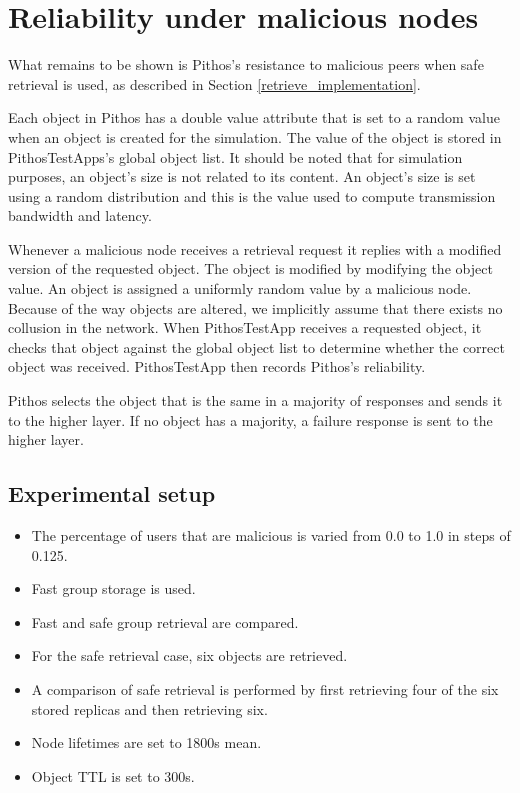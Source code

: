 \section{Reliability under malicious nodes}
\label{malicious_results}

What remains to be shown is Pithos's resistance to malicious peers when safe retrieval is used, as described in Section \ref{retrieve_implementation}.

Each object in Pithos has a double value attribute that is set to a random value when an object is created for the simulation. The value of the object is stored in PithosTestApps's global object list. It should be noted that for simulation purposes, an object's size is not related to its content. An object's size is set using a random distribution and this is the value used to compute transmission bandwidth and latency.

Whenever a malicious node receives a retrieval request it replies with a modified version of the requested object. The object is modified by modifying the object value. An object is assigned a uniformly random value by a malicious node. Because of the way objects are altered, we implicitly assume that there exists no collusion in the network. When PithosTestApp receives a requested object, it checks that object against the global object list to determine whether the correct object was received. PithosTestApp then records Pithos's reliability.

Pithos selects the object that is the same in a majority of responses and sends it to the higher layer. If no object has a majority, a failure response is sent to the higher layer.

\subsection{Experimental setup}

\begin{itemize}
\item The percentage of users that are malicious is varied from 0.0 to 1.0 in steps of 0.125.

\item Fast group storage is used.

\item Fast and safe group retrieval are compared.

\item For the safe retrieval case, six objects are retrieved.

\item A comparison of safe retrieval is performed by first retrieving four of the six stored replicas and then retrieving six.

\item Node lifetimes are set to 1800s mean.

\item Object TTL is set to 300s.
\end{itemize}

